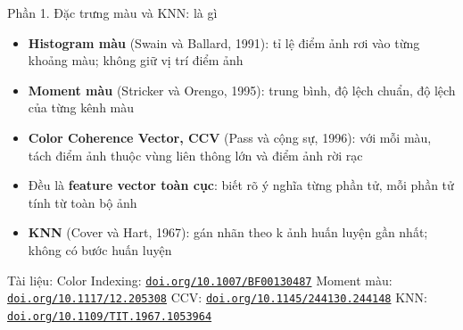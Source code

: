 \documentclass[aspectratio=169,10pt]{beamer}
\begin{document}
\begin{frame}{Phần 1. Đặc trưng màu và KNN: là gì}
\begin{itemize}
\item \textbf{Histogram màu} (Swain và Ballard, 1991): tỉ lệ điểm ảnh rơi vào từng khoảng màu; không giữ vị trí điểm ảnh
\item \textbf{Moment màu} (Stricker và Orengo, 1995): trung bình, độ lệch chuẩn, độ lệch của từng kênh màu
\item \textbf{Color Coherence Vector, CCV} (Pass và cộng sự, 1996): với mỗi màu, tách điểm ảnh thuộc vùng liên thông lớn và điểm ảnh rời rạc
\item Đều là \textbf{feature vector toàn cục}: biết rõ ý nghĩa từng phần tử, mỗi phần tử tính từ toàn bộ ảnh
\item \textbf{KNN} (Cover và Hart, 1967): gán nhãn theo k ảnh huấn luyện gần nhất; không có bước huấn luyện
\end{itemize}
\vfill{\scriptsize\color{uitgray}Tài liệu: Color Indexing: \href{https://doi.org/10.1007/BF00130487}{\texttt{doi.org/10.1007/BF00130487}} \textbar{} Moment màu: \href{https://doi.org/10.1117/12.205308}{\texttt{doi.org/10.1117/12.205308}} \textbar{} CCV: \href{https://doi.org/10.1145/244130.244148}{\texttt{doi.org/10.1145/244130.244148}} \textbar{} KNN: \href{https://doi.org/10.1109/TIT.1967.1053964}{\texttt{doi.org/10.1109/TIT.1967.1053964}}}
\end{frame}
\end{document}
